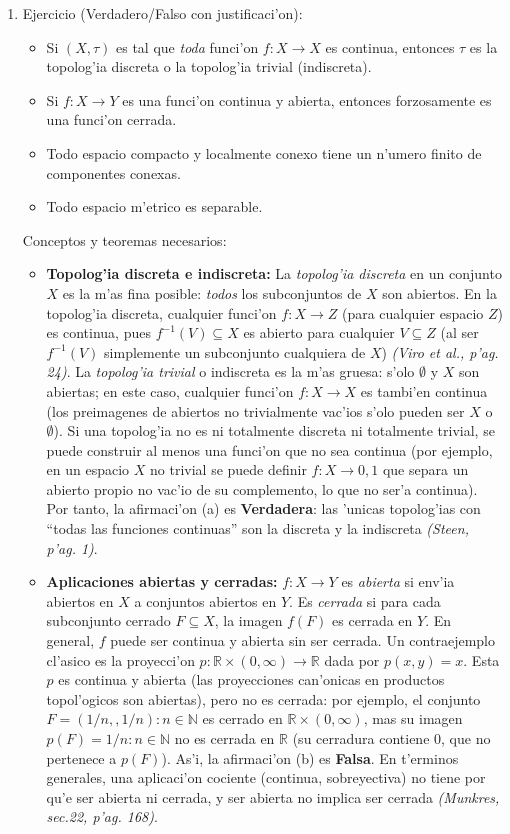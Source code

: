 \documentclass[a4paper,11pt]{article}  %
\begin{document}
\begin{enumerate}
\begin{itemize}
\end{itemize} \item Ejercicio (Verdadero/Falso con justificaci'on):
\begin{itemize}
\item[(a)] Si $(X,\tau)$ es tal que \emph{toda} funci'on $f: X\to X$ es continua, entonces $\tau$ es la topolog'ia discreta o la topolog'ia trivial (indiscreta).
\item[(b)] Si $f: X\to Y$ es una funci'on continua y abierta, entonces forzosamente es una funci'on cerrada.
\item[(c)] Todo espacio compacto y localmente conexo tiene un n'umero finito de componentes conexas.
\item[(d)] Todo espacio m'etrico es separable.
\end{itemize} Conceptos y teoremas necesarios:
\begin{itemize}
\item \textbf{Topolog'ia discreta e indiscreta:} La \emph{topolog'ia discreta} en un conjunto $X$ es la m'as fina posible: \emph{todos} los subconjuntos de $X$ son abiertos. En la topolog'ia discreta, cualquier funci'on $f: X\to Z$ (para cualquier espacio $Z$) es continua, pues $f^{-1}(V)\subseteq X$ es abierto para cualquier $V\subseteq Z$ (al ser $f^{-1}(V)$ simplemente un subconjunto cualquiera de $X$) \emph{(Viro et al., p'ag. 24)}. La \emph{topolog'ia trivial} o indiscreta es la m'as gruesa: s'olo $\emptyset$ y $X$ son abiertas; en este caso, cualquier funci'on $f: X\to X$ es tambi'en continua (los preimagenes de abiertos no trivialmente vac'ios s'olo pueden ser $X$ o $\emptyset$). Si una topolog'ia no es ni totalmente discreta ni totalmente trivial, se puede construir al menos una funci'on que no sea continua (por ejemplo, en un espacio $X$ no trivial se puede definir $f: X\to {0,1}$ que separa un abierto propio no vac'io de su complemento, lo que no ser'a continua). Por tanto, la afirmaci'on (a) es \textbf{Verdadera}: las 'unicas topolog'ias con “todas las funciones continuas” son la discreta y la indiscreta \emph{(Steen, p'ag. 1)}.
\item \textbf{Aplicaciones abiertas y cerradas:} $f: X\to Y$ es \emph{abierta} si env'ia abiertos en $X$ a conjuntos abiertos en $Y$. Es \emph{cerrada} si para cada subconjunto cerrado $F\subseteq X$, la imagen $f(F)$ es cerrada en $Y$. En general, $f$ puede ser continua y abierta sin ser cerrada. Un contraejemplo cl'asico es la proyecci'on $p: \mathbb{R}\times (0,\infty)\to \mathbb{R}$ dada por $p(x,y)=x$. Esta $p$ es continua y abierta (las proyecciones can'onicas en productos topol'ogicos son abiertas), pero no es cerrada: por ejemplo, el conjunto $F={(1/n,,1/n) : n\in\mathbb{N}}$ es cerrado en $\mathbb{R}\times(0,\infty)$, mas su imagen $p(F)={1/n: n\in\mathbb{N}}$ no es cerrada en $\mathbb{R}$ (su cerradura contiene $0$, que no pertenece a $p(F)$). As'i, la afirmaci'on (b) es \textbf{Falsa}. En t'erminos generales, una aplicaci'on cociente (continua, sobreyectiva) no tiene por qu'e ser abierta ni cerrada, y ser abierta no implica ser cerrada \emph{(Munkres, sec.22, p'ag. 168)}.

\end{itemize}
\end{enumerate}
\end{document}
